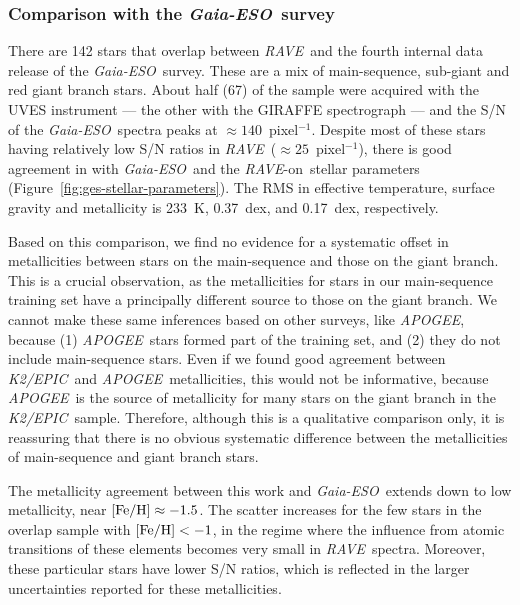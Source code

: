 \documentclass[preprint]{aastex}
\newcommand{\acronym}[1]{{\small{#1}}}
\newcommand{\project}[1]{\textsl{#1}}
\newcommand{\rave}{\project{\acronym{RAVE}}}
\newcommand{\ges}{\project{Gaia-ESO}}
\newcommand{\apogee}{\project{\acronym{APOGEE}}}
\newcommand{\epic}{\project{K2/EPIC}}
\newcommand{\raveon}{\rave-on}
\begin{document}
\subsubsection{Comparison with the \ges\ survey}
\label{sec:validation-ges}


There are 142 stars that overlap between \rave\ and the fourth internal
data release of the \ges\ survey. These are a mix of main-sequence, 
sub-giant and red giant branch stars.  About half (67) of the sample 
were acquired with the \acronym{UVES} instrument --- the other with the 
\acronym{GIRAFFE} spectrograph --- and the S/N of the \ges\ spectra peaks 
at $\approx140$~pixel$^{-1}$.  Despite most of these stars having relatively 
low S/N ratios in \rave\ ($\approx 25$~pixel$^{-1}$), there is good agreement
in with \ges\ and the \raveon\ stellar parameters (Figure~\ref{fig:ges-stellar-parameters}).  
The RMS in effective temperature, surface gravity and metallicity is 233~K, 
0.37~dex, and 0.17~dex, respectively.  


Based on this comparison, we find no evidence for a systematic offset in
metallicities between stars on the main-sequence and those on the giant branch. 
This is a crucial observation, as the metallicities for stars in our 
main-sequence training set have a principally different source to those on 
the giant branch.  We cannot make these same inferences based on other 
surveys, like \apogee, because (1) \apogee\ stars formed part of the 
training set, and (2) they do not include main-sequence stars.  Even if we 
found good agreement between \epic\ and \apogee\ metallicities, this would 
not be informative, because \apogee\ is the source of metallicity for many 
stars on the giant branch in the \epic\ sample. Therefore, although this is
a qualitative comparison only, it is reassuring that there is no obvious 
systematic difference between the metallicities of main-sequence and giant
branch stars.


The metallicity agreement between this work and \ges\ extends down to low
metallicity, near $[{\rm Fe/H}] \approx -1.5$.  The scatter increases for
the few stars in the overlap sample with $[{\rm Fe/H}] < -1$, in the regime
where the influence from atomic transitions of these elements becomes very
small in \rave\ spectra. Moreover, these particular stars have lower S/N
ratios, which is reflected in the larger uncertainties
reported for these metallicities. 
\end{document}

